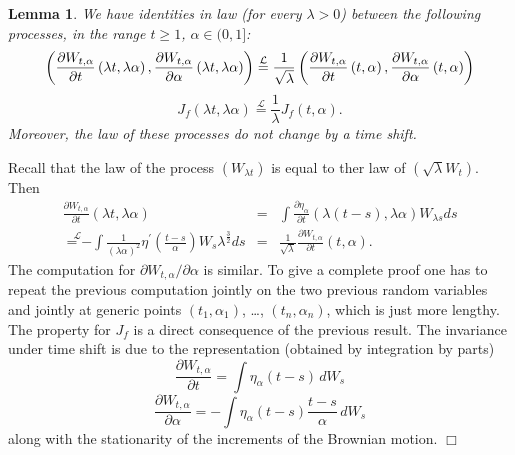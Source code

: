 \documentclass{article}
\newtheorem{lemma}[theorem]{Lemma}
\newenvironment{proof}[1][Proof]{{\sc #1.} }{\hfill $\Box$}
\begin{document}

\begin{lemma}
We have identities in law (for every $\lambda >0$) between the following
processes, in the range $t\geq 1$, $\alpha \in (0,1]$: 
\begin{equation*}
\left( \frac{\partial W_{t,\alpha }}{\partial t}\left( \lambda t,\lambda
\alpha \right) ,\frac{\partial W_{t,\alpha }}{\partial \alpha }\left(
\lambda t,\lambda \alpha \right) \right) \overset{\mathcal{L}}{=}\frac{1}{%
\sqrt{\lambda }}\left( \frac{\partial W_{t,\alpha }}{\partial t}\left(
t,\alpha \right) ,\frac{\partial W_{t,\alpha }}{\partial \alpha }\left(
t,\alpha \right) \right)
\end{equation*}
\begin{equation*}
J_{f}\left( \lambda t,\lambda \alpha \right) \overset{\mathcal{L}}{=}\frac{1%
}{\lambda }J_{f}\left( t,\alpha \right) .
\end{equation*}
Moreover, the law of these processes do not change by a time shift.
\end{lemma}

\begin{proof}
Recall that the law of the process $\left( W_{\lambda t}\right) $ is equal
to ther law of $( \sqrt{\lambda }W_{t}) $. Then 
\begin{eqnarray*}
\frac{\partial W_{t,\alpha }}{\partial t}\left( \lambda t,\lambda \alpha
\right) &=&\int \frac{\partial \eta _{\alpha }}{\partial t}\left( \lambda
\left( t-s\right) ,\lambda \alpha \right) W_{\lambda s}ds \\
\overset{\mathcal{L}}{=-}\int \frac{1}{\left( \lambda \alpha \right) ^{2}}%
\eta ^{\prime }\left( \frac{t-s}{\alpha }\right) W_{s}\lambda ^{\frac{3}{2}%
}ds &=&\frac{1}{\sqrt{\lambda }}\frac{\partial W_{t,\alpha }}{\partial t}%
\left( t,\alpha \right) .
\end{eqnarray*}
The computation for $\partial W_{t,\alpha }/\partial \alpha$ is
similar. 
To give a complete proof one has to repeat
the previous computation jointly on the two previous random variables and
jointly at generic points $\left( t_{1},\alpha _{1}\right) $, \dots , $\left(
t_{n},\alpha _{n}\right) $, which is just more lengthy. The property for $%
J_{f}$ is a direct consequence of the previous result. The invariance under
time shift is due to the representation (obtained by integration by parts) 
\begin{equation*}
\frac{\partial W_{t,\alpha }}{\partial t}=\int \eta _{\alpha }\left(
t-s\right) \,dW_{s}
\end{equation*}
\begin{equation*}
\frac{\partial W_{t,\alpha }}{\partial \alpha }=-\int \eta _{\alpha }\left(
t-s\right) \frac{t-s}{\alpha }\,dW_{s}
\end{equation*}
along with the stationarity of the increments of the Brownian motion.
\end{proof}
\end{document}
